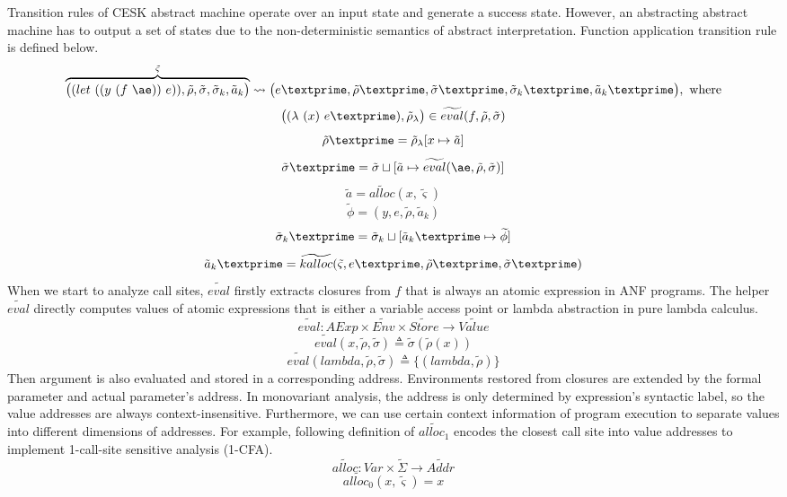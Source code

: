 \documentclass[12pt]{report}
\begin{document}
Transition rules of CESK abstract machine operate over an input state and generate a success state.
However, an abstracting abstract machine has to output a set of states due to the non-deterministic semantics of abstract interpretation.
Function application transition rule is defined below.
\[
\overbrace{
\big((let\ ((y\ (f\ \ae))\ e)), \tilde{\rho}, \tilde{\sigma}, \tilde{\sigma}_k, \tilde{a}_k \big)
}^{\tilde{\varsigma}}
\leadsto \big(e\textprime,\tilde{\rho}\textprime, \tilde{\sigma}\textprime, \tilde{\sigma}_k\textprime, \tilde{a}_k\textprime \big), \mbox{ where}
\]
\[
\big((\lambda\ (x)\ e\textprime), \tilde{\rho}_{\lambda}  \big) \in \widetilde{eval}(f, \tilde{\rho}, \tilde{\sigma})
\]
\[
\tilde{\rho}\textprime = \tilde{\rho}_{\lambda}[x \mapsto \tilde{a}]
\]
\[
\tilde{\sigma}\textprime = \tilde{\sigma} \sqcup [\tilde{a} \mapsto \widetilde{eval}(\ae, \tilde{\rho}, \tilde{\sigma})]
\]
\[
\tilde{a} = \widetilde{alloc}(x, \tilde{\varsigma})
\]
\[
\widetilde{\phi} = {(y, e, \tilde{\rho}, \tilde{a}_k)}
\]
\[
\tilde{\sigma}_k\textprime = \tilde{\sigma}_k \sqcup [\tilde{a}_k\textprime \mapsto \widetilde{\phi}]
\]
\[
\tilde{a}_k\textprime = \widetilde{kalloc}(\tilde{\varsigma}, e\textprime, \tilde{\rho}\textprime, \tilde{\sigma}\textprime)
\]
When we start to analyze call sites, $\widetilde{eval}$ firstly extracts closures from $f$ that is always an atomic expression in ANF programs.
The helper $\widetilde{eval}$ directly computes values of atomic expressions that is either a variable access point or lambda abstraction in pure lambda calculus.
\[
\widetilde{eval} : AExp \times \widetilde{Env} \times \widetilde{Store} \to \widetilde{Value}
\]
\[
\widetilde{eval}(x, \tilde{\rho}, \tilde{\sigma}) \triangleq \tilde{\sigma}(\tilde{\rho}(x))
\]
\[
\widetilde{eval}(lambda, \tilde{\rho}, \tilde{\sigma}) \triangleq \{(lambda, \tilde{\rho})\}
\]
Then argument is also evaluated and stored in a corresponding address.
Environments restored from closures are extended by the formal parameter and actual parameter's address.
In monovariant analysis, the address is only determined by expression's syntactic label, so the value addresses are always context-insensitive. Furthermore, we can use certain context information of program execution to separate values into different dimensions of addresses.
For example, following definition of $\widetilde{alloc_1}$ encodes the closest call site into value addresses to implement 1-call-site sensitive analysis (1-CFA).
\[
\widetilde{alloc} : Var \times \tilde{\Sigma} \to \widetilde{Addr}
\]
\[
\widetilde{alloc_0} (x, \tilde{\varsigma}) = x
\]
\end{document}
